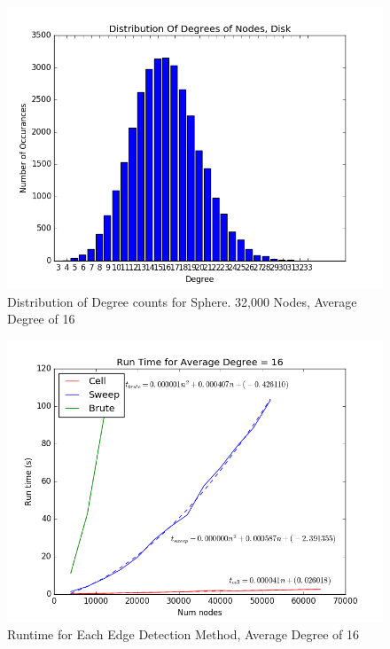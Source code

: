 \documentclass{article}
\begin{document}
\begin{figure}
    \centering
    \includegraphics[scale=0.6]{./graphs/hist_deg_sphere.png}
    \caption{Distribution of Degree counts for Sphere. 32,000 Nodes, Average Degree of 16}
    \label{spheredeghist}
\end{figure}

\begin{figure}
    \centering
    \includegraphics[scale=0.6]{./graphs/run_time_avg_deg_16.png}
    \caption{Runtime for Each Edge Detection Method, Average Degree of 16}
    \label{avgdeg}
\end{figure}
\end{document}

